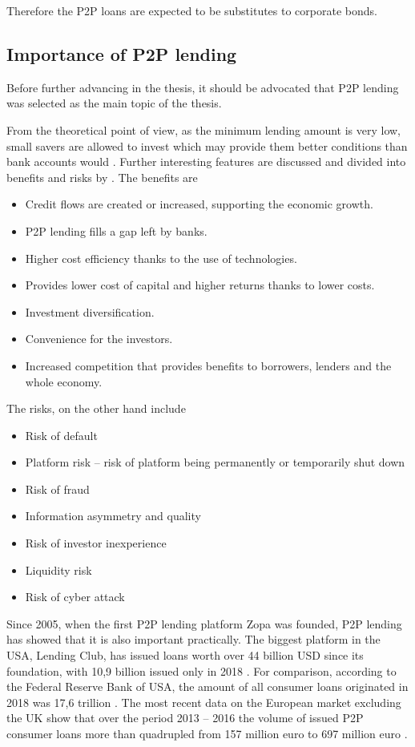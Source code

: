 Therefore the P2P loans are expected to be substitutes to corporate bonds.

\subsection{Importance of P2P lending}

Before further advancing in the thesis, it should be advocated that P2P lending was selected as the main topic of the thesis. 

From the theoretical point of view, as the minimum lending amount is very low, small savers are allowed to invest which may provide them better conditions than bank accounts would \cite[]{Ashta2009}. Further interesting features are discussed and divided into benefits and risks by \cite{Kirby2014}. The benefits are 

\begin{itemize}
\item Credit flows are created or increased, supporting the economic growth.
\item P2P lending fills a gap left by banks.
\item Higher cost efficiency thanks to the use of technologies.
\item Provides lower cost of capital and higher returns thanks to lower costs.
\item Investment diversification.
\item Convenience for the investors.
\item Increased competition that provides benefits to borrowers, lenders and the whole economy.
\end{itemize}

The risks, on the other hand include

\begin{itemize}
\item Risk of default
\item Platform risk – risk of platform being permanently or temporarily shut down
\item Risk of fraud
\item Information asymmetry and quality
\item Risk of investor inexperience
\item Liquidity risk
\item Risk of cyber attack
\end{itemize}

Since 2005, when the first P2P lending platform Zopa was founded, P2P lending has showed that it is also important practically. The biggest platform in the USA, Lending Club, has issued loans worth over 44 billion USD since its foundation, with 10,9 billion issued only in 2018 \cite[]{LendingClub}.
For comparison, according to the Federal Reserve Bank of USA, the amount of all consumer loans originated in 2018 was 17,6 trillion  \cite[]{FRED}. 
The most recent data on the European market excluding the UK show that over the period 2013 – 2016 the volume of issued P2P consumer loans more than quadrupled from 157 million euro to 697 million euro \cite[]{Ziegler2018}. 

